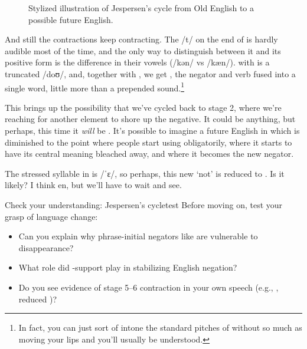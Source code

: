 \begin{figure}
\begin{tikzpicture}
\end{tikzpicture}
    \caption{Stylized illustration of Jespersen's cycle from Old English to a possible future English.}
    \label{fig:Jesp-cycle}
\end{figure}

And still the contractions keep contracting. The /t/ on the end of  is hardly audible most of the time, and the only way to distinguish between it and its positive form is the difference in their vowels (/kən/ vs /kæn/).  with  is a truncated /doʊ/, and, together with , we get , the negator and verb fused into a single word, little more than a prepended  sound.\footnote{In fact, you can just sort of intone the standard pitches of  without so much as moving your lips and you'll usually be understood.}

This brings up the possibility that we've cycled back to stage 2, where we're reaching for another element to shore up the negative. It could be anything, but perhaps, this time it \emph{will} be . It's possible to imagine a future English in which  is diminished to the point where people start using  obligatorily, where it starts to have its central meaning bleached away, and where it becomes the new negator.

The stressed syllable in  is /ˈɛ/, so perhaps, this new `not' is reduced to . Is it likely? I think en, but we'll have to wait and see.

\begin{tblsframedsymbol}{Check your understanding: Jespersen's cycle}{test}
Before moving on, test your grasp of language change:
\begin{itemize}[noitemsep, leftmargin=*]
    \item Can you explain why phrase-initial negators like  are vulnerable to disappearance?
    \item What role did -support play in stabilizing English negation?
    \item Do you see evidence of stage 5--6 contraction in your own speech (e.g., , reduced )?
\end{itemize}
\end{tblsframedsymbol}



